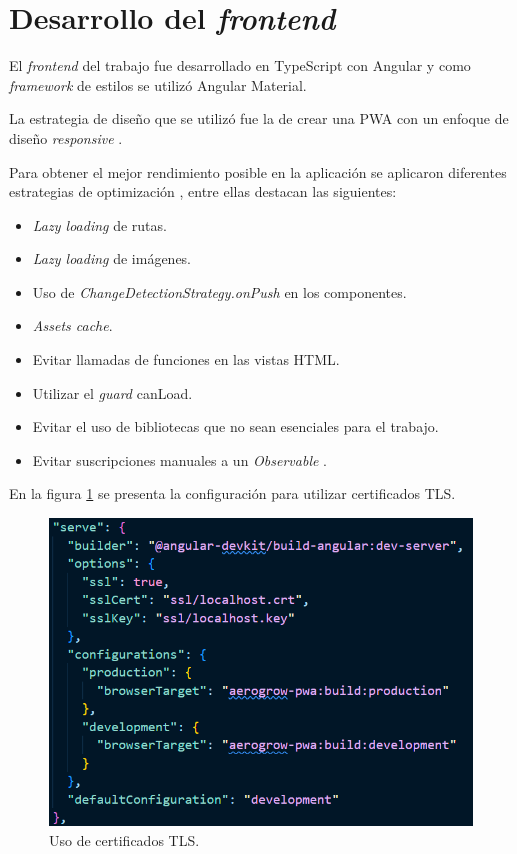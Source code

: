 \section{Desarrollo del \emph{frontend}}
El \emph{frontend} del trabajo fue desarrollado en TypeScript con Angular y como \textit{framework} de estilos se utilizó Angular Material.

La estrategia de diseño que se utilizó fue la de crear una PWA con un enfoque de diseño \emph{responsive} \citep{WEBSITE:RESPONSIVE}.

Para obtener el mejor rendimiento posible en la aplicación se aplicaron diferentes estrategias de optimización \citep{WEBSITE:ANGULAROPTIMIZACION1} \citep{WEBSITE:ANGULAROPTIMIZACION2}, entre ellas destacan las siguientes:
\begin{itemize}
	\item \emph{Lazy loading} de rutas.
	\item \emph{Lazy loading} de imágenes.
	\item Uso de \textit{ChangeDetectionStrategy.onPush} en los componentes.
	\item \textit{Assets cache}.
	\item Evitar llamadas de funciones en las vistas HTML.
	\item Utilizar el \emph{guard} canLoad.
	\item Evitar el uso de bibliotecas que no sean esenciales para el trabajo.
	\item Evitar suscripciones manuales a un \textit{Observable} \citep{WEBSITE:OBSERVABLE}. 
\end{itemize}

En la figura \ref{fig:certificadosTLSDelFrontend} se presenta la configuración para utilizar certificados TLS.

\begin{figure}[H]
	\centering
	\includegraphics[width=.7\textwidth]{./Figures/Certificados TLS en Angular.png}
	\caption{Uso de certificados TLS.}
	\label{fig:certificadosTLSDelFrontend}
\end{figure}

